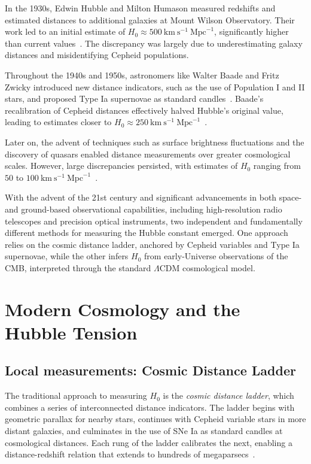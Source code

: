 In the 1930s, Edwin Hubble and Milton Humason measured redshifts and estimated distances to additional galaxies at Mount Wilson Observatory. Their work led to an initial estimate of $H_0 \approx 500~\mathrm{km}~\mathrm{s}^{-1}~\mathrm{Mpc}^{-1}$, significantly higher than current values~\citep{hubble1936realm}. The discrepancy was largely due to underestimating galaxy distances and misidentifying Cepheid populations.

Throughout the 1940s and 1950s, astronomers like Walter Baade and Fritz Zwicky introduced new distance indicators, such as the use of Population I and II stars, and proposed Type Ia supernovae as standard candles~\citep{zwicky1942frequency,Baade1952,Baade1944}. Baade's recalibration of Cepheid distances effectively halved Hubble's original value, leading to estimates closer to $H_0 \approx 250~\mathrm{km}~\mathrm{s}^{-1}~\mathrm{Mpc}^{-1}$~\citep{Baade1952,Longair_2006}.

Later on, the advent of techniques such as surface brightness fluctuations and the discovery of quasars enabled distance measurements over greater cosmological scales. However, large discrepancies persisted, with estimates of $H_0$ ranging from $50$ to $100~\mathrm{km}~\mathrm{s}^{-1}~\mathrm{Mpc}^{-1}$~\citep{sandage1958current,de1972velocity,sandage1982steps,de1985tycho}.

With the advent of the 21st century and significant advancements in both space- and ground-based observational capabilities, including high-resolution radio telescopes and precision optical instruments, two independent and fundamentally different methods for measuring the Hubble constant emerged. One approach relies on the cosmic distance ladder, anchored by Cepheid variables and Type Ia supernovae, while the other infers $H_0$ from early-Universe observations of the \ac{CMB}, interpreted through the standard $\Lambda$CDM cosmological model.

\section{Modern Cosmology and the Hubble Tension}
\subsection{Local measurements: Cosmic Distance Ladder}
The traditional approach to measuring $H_0$ is the \textit{cosmic distance ladder}, which combines a series of interconnected distance indicators. The ladder begins with geometric parallax for nearby stars, continues with Cepheid variable stars in more distant galaxies, and culminates in the use of \ac{SNe Ia} as standard candles at cosmological distances. Each rung of the ladder calibrates the next, enabling a distance-redshift relation that extends to hundreds of megaparsecs~\citep{freedman2001final,cosmicdistanceladder,Riess:2019cxk,riess2022comprehensive}.

